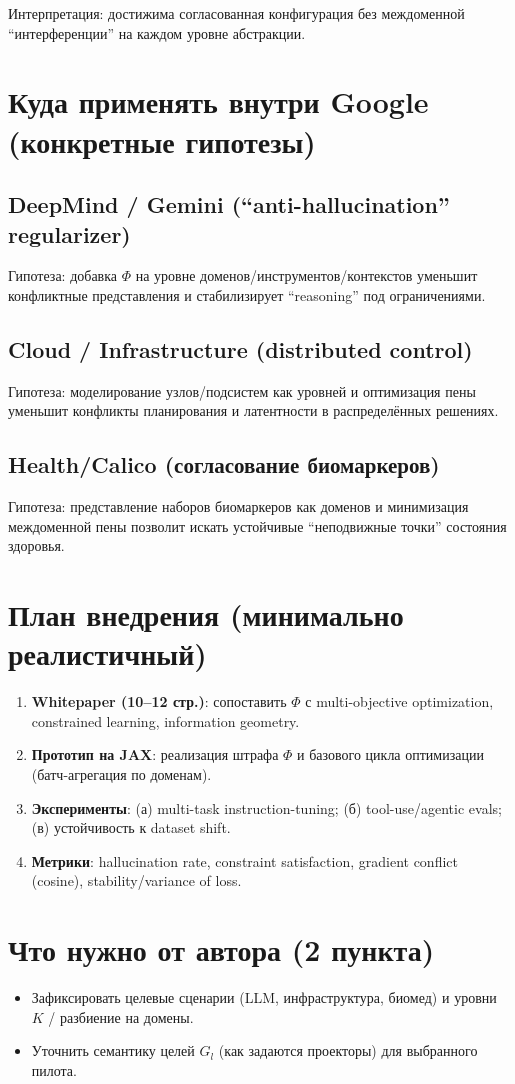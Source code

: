 \documentclass[11pt]{article}
\begin{document}
Интерпретация: достижима согласованная конфигурация без междоменной ``интерференции'' на каждом уровне абстракции.

\section{Куда применять внутри Google (конкретные гипотезы)}

\subsection{DeepMind / Gemini (``anti-hallucination'' regularizer)}

Гипотеза: добавка $\Phi$ на уровне доменов/инструментов/контекстов уменьшит конфликтные представления и стабилизирует ``reasoning'' под ограничениями.

\subsection{Cloud / Infrastructure (distributed control)}

Гипотеза: моделирование узлов/подсистем как уровней и оптимизация пены уменьшит конфликты планирования и латентности в распределённых решениях.

\subsection{Health/Calico (согласование биомаркеров)}

Гипотеза: представление наборов биомаркеров как доменов и минимизация междоменной пены позволит искать устойчивые ``неподвижные точки'' состояния здоровья.

\section{План внедрения (минимально реалистичный)}

\begin{enumerate}[leftmargin=*, itemsep=3pt]
  \item \textbf{Whitepaper (10--12 стр.)}: сопоставить $\Phi$ с multi-objective optimization, constrained learning, information geometry.
  \item \textbf{Прототип на JAX}: реализация штрафа $\Phi$ и базового цикла оптимизации (батч-агрегация по доменам).
  \item \textbf{Эксперименты}: (а) multi-task instruction-tuning; (б) tool-use/agentic evals; (в) устойчивость к dataset shift.
  \item \textbf{Метрики}: hallucination rate, constraint satisfaction, gradient conflict (cosine), stability/variance of loss.
\end{enumerate}

\section{Что нужно от автора (2 пункта)}

\begin{itemize}[leftmargin=*, itemsep=2pt]
  \item Зафиксировать целевые сценарии (LLM, инфраструктура, биомед) и уровни $K$ / разбиение на домены.
  \item Уточнить семантику целей $G_l$ (как задаются проекторы) для выбранного пилота.
\end{itemize}
\end{document}
